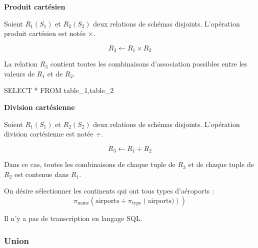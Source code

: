 \documentclass[10pt,fleqn]{article} %
\begin{document}
\begin{defi}

\textbf{Produit cartésien}

Soient $R_1(S_1)$ et $R_2(S_2)$ deux relations de schémas disjoints. L'opération produit cartésien est notée $\times$. 

$$
R_3 \leftarrow R_1 \times R_2
$$

La relation $R_3$ contient toutes les combinaisons d'association possibles entre les valeurs de $R_1$ et de $R_2$.

\begin{envsql}
\begin{sql}
SELECT * FROM table_1,table_2
\end{sql}
\end{envsql}

\end{defi}



\begin{defi}

\textbf{Division cartésienne}

Soient $R_1(S_1)$ et $R_2(S_2)$ deux relations de schémas disjoints. L'opération division cartésienne est notée $\div$. 

$$
R_3 \leftarrow R_1 \div R_2
$$

Dans ce cas, toutes les combinaisons de chaque tuple de $R_3$ et de chaque tuple de $R_2$ est contenue dans $R_1$.

\end{defi}


\begin{exemple}
On désire sélectionner les continents qui ont tous types d'aéroports :
$$
\pi_{\text{name}}\left(\text{airports} \div \pi_{\text{type}}\left( \text{airports})\right)\right)
$$

Il n'y a pas de transcription en langage SQL.
\end{exemple}



\subsubsection{Union}
\end{document}
